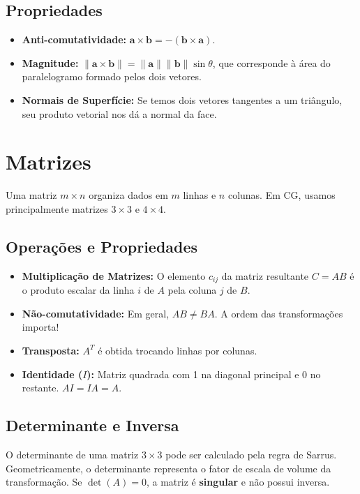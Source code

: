 \subsection{Propriedades}

\begin{itemize}
    \item \textbf{Anti-comutatividade:} $\mathbf{a} \times \mathbf{b} = -(\mathbf{b} \times \mathbf{a})$.
    \item \textbf{Magnitude:} $\|\mathbf{a} \times \mathbf{b}\| = \|\mathbf{a}\| \|\mathbf{b}\| \sin\theta$, que corresponde à área do paralelogramo formado pelos dois vetores.
    \item \textbf{Normais de Superfície:} Se temos dois vetores tangentes a um triângulo, seu produto vetorial nos dá a normal da face.
\end{itemize}

\section{Matrizes}

Uma matriz $m \times n$ organiza dados em $m$ linhas e $n$ colunas. Em CG, usamos principalmente matrizes $3 \times 3$ e $4 \times 4$.

\subsection{Operações e Propriedades}

\begin{itemize}
    \item \textbf{Multiplicação de Matrizes:} O elemento $c_{ij}$ da matriz resultante $C = AB$ é o produto escalar da linha $i$ de $A$ pela coluna $j$ de $B$.
    \item \textbf{Não-comutatividade:} Em geral, $AB \neq BA$. A ordem das transformações importa!
    \item \textbf{Transposta:} $A^T$ é obtida trocando linhas por colunas.
    \item \textbf{Identidade ($I$):} Matriz quadrada com 1 na diagonal principal e 0 no restante. $AI = IA = A$.
\end{itemize}

\subsection{Determinante e Inversa}

O determinante de uma matriz $3 \times 3$ pode ser calculado pela regra de Sarrus. Geometricamente, o determinante representa o fator de escala de volume da transformação. Se $\det(A) = 0$, a matriz é \textbf{singular} e não possui inversa.


